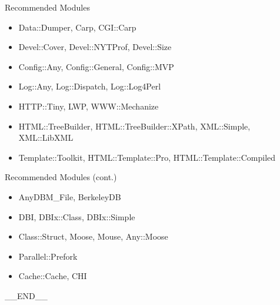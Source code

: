 \documentclass{beamer}
\begin{document}
\begin{frame}[containsverbatim]{Recommended Modules}
  \begin{itemize}
    \item Data::Dumper, Carp, CGI::Carp
    \item Devel::Cover, Devel::NYTProf, Devel::Size
    \item Config::Any, Config::General, Config::MVP
    \item Log::Any, Log::Dispatch, Log::Log4Perl
    \item HTTP::Tiny, LWP, WWW::Mechanize
    \item HTML::TreeBuilder, HTML::TreeBuilder::XPath, XML::Simple, XML::LibXML
    \item Template::Toolkit, HTML::Template::Pro, HTML::Template::Compiled
  \end{itemize}
\end{frame}

\begin{frame}[containsverbatim]{Recommended Modules (cont.)}
  \begin{itemize}
    \item AnyDBM\_File, BerkeleyDB
    \item DBI, DBIx::Class, DBIx::Simple
    \item Class::Struct, Moose, Mouse, Any::Moose
    \item Parallel::Prefork
    \item Cache::Cache, CHI
  \end{itemize}
\end{frame}

\begin{frame}
  \begin{center}
    \_\_END\_\_
  \end{center}
\end{frame}
\end{document}
